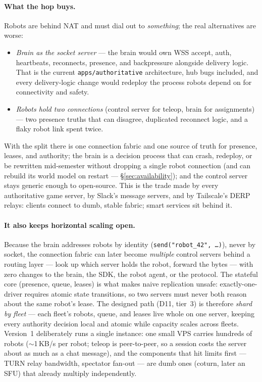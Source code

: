 \documentclass[11pt]{article}
\begin{document}
\paragraph{What the hop buys.} Robots are behind NAT and must dial out to
\emph{something}; the real alternatives are worse:

\begin{itemize}[itemsep=1pt]
  \item \emph{Brain as the socket server} --- the brain would own WSS accept, auth,
        heartbeats, reconnects, presence, and backpressure alongside delivery logic.
        That is the current \texttt{apps/authoritative} architecture, hub bugs
        included, and every delivery-logic change would redeploy the process robots
        depend on for connectivity and safety.
  \item \emph{Robots hold two connections} (control server for teleop, brain for
        assignments) --- two presence truths that can disagree, duplicated reconnect
        logic, and a flaky robot link spent twice.
\end{itemize}

With the split there is one connection fabric and one source of truth for presence,
leases, and authority; the brain is a decision process that can crash, redeploy,
or be rewritten mid-semester without dropping a single robot connection (and can
rebuild its world model on restart --- \S\ref{sec:availability}); and the
control server stays generic enough to open-source. This is the trade made by every
authoritative game server, by Slack's message servers, and by Tailscale's DERP relays:
clients connect to dumb, stable fabric; smart services sit behind it.

\paragraph{It also keeps horizontal scaling open.} Because the brain addresses robots
by identity (\texttt{send("robot\_42", \dots)}), never by socket, the connection
fabric can later become \emph{multiple} control servers behind a routing layer ---
look up which server holds the robot, forward the bytes --- with zero changes to the
brain, the SDK, the robot agent, or the protocol. The stateful core (presence, queue,
leases) is what makes naive replication unsafe: exactly-one-driver requires atomic
state transitions, so two servers must never both reason about the same robot's lease.
The designed path (D11, tier~3) is therefore \emph{shard by fleet} --- each fleet's
robots, queue, and leases live whole on one server, keeping every authority decision
local and atomic while capacity scales across fleets. Version~1 deliberately runs a
single instance: one small VPS carries hundreds of robots ($\sim$1\,KB/s per robot;
teleop is peer-to-peer, so a session costs the server about as much as a chat
message), and the components that hit limits first --- TURN relay bandwidth, spectator
fan-out --- are dumb ones (coturn, later an SFU) that already multiply independently.
\end{document}
